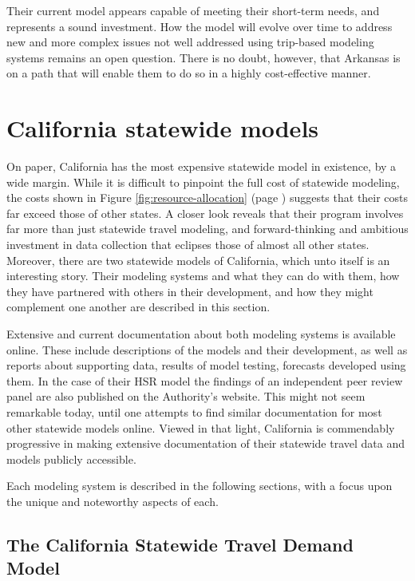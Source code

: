 Their current model appears capable of meeting their short-term needs, and represents a sound investment. How the model will evolve over time to address new and more complex issues not well addressed using trip-based modeling systems remains an open question. There is no doubt, however, that Arkansas is on a path that will enable them to do so in a highly cost-effective manner.

\section{California statewide models}\label{sec:ca-statewide-models}

On paper, California has the most expensive statewide model in existence, by a wide margin. While it is difficult to pinpoint the full cost of statewide modeling, the costs shown in Figure \ref{fig:resource-allocation} (page \pageref{fig:resource-allocation}) suggests that their costs far exceed those of other states. A closer look reveals that their program involves far more than just statewide travel modeling, and forward-thinking and ambitious investment in data collection that eclipses those of almost all other states. Moreover, there are two statewide models of California, which unto itself is an interesting story. Their modeling systems and what they can do with them, how they have partnered with others in their development, and how they might complement one another are described in this section.

Extensive and current documentation about both modeling systems is available online. These include descriptions of the models and their development, as well as reports about supporting data, results of model testing, forecasts developed using them. In the case of their HSR model the findings of an independent peer review panel are also published on the Authority's website. This might not seem remarkable today, until one attempts to find similar documentation for most other statewide models online. Viewed in that light, California is commendably progressive in making extensive documentation of their statewide travel data and models publicly accessible.

Each modeling system is described in the following sections, with a focus upon the unique and noteworthy aspects of each.

\subsection{The California Statewide Travel Demand Model}

